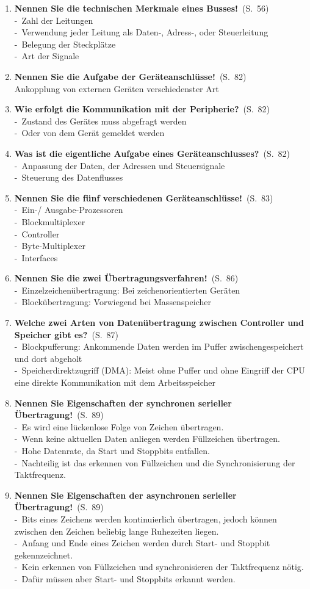 \documentclass[a4paper,12pt]{article}
\newcommand{\question}[3]{\pagebreak[3]\item {\textbf{#1?}}\ (S.\ #2)#3}
\newcommand{\statement}[3]{\pagebreak[3]\item {\textbf{#1!}}\ (S.\ #2)#3}
\newcommand{\catchword}[1]{\\-\ #1}
\newcommand{\normaltext}[1]{\\#1}
\newcommand{\page}[1]{#1}
\begin{document}
\begin{enumerate}
  \statement{Nennen Sie die technischen Merkmale eines Busses}{\page{56}}
  {
    \catchword{Zahl der Leitungen}
    \catchword{Verwendung jeder Leitung als Daten-, Adress-, oder Steuerleitung}
    \catchword{Belegung der Steckplätze}
    \catchword{Art der Signale}
  }

  \statement{Nennen Sie die Aufgabe der Geräteanschlüsse}{\page{82}}
  {
    \normaltext{Ankopplung von externen Geräten verschiedenster Art}
  }

  \question{Wie erfolgt die Kommunikation mit der Peripherie}{\page{82}}
  {
    \catchword{Zustand des Gerätes muss abgefragt werden}
    \catchword{Oder von dem Gerät gemeldet werden}
  }

  \question{Was ist die eigentliche Aufgabe eines Geräteanschlusses}{\page{82}}
  {
    \catchword{Anpassung der Daten, der Adressen und Steuersignale}
    \catchword{Steuerung des Datenflusses}
  }

  \statement{Nennen Sie die fünf verschiedenen Geräteanschlüsse}{\page{83}}
  {
    \catchword{Ein-/ Ausgabe-Prozessoren}
    \catchword{Blockmultiplexer}
    \catchword{Controller}
    \catchword{Byte-Multiplexer}
    \catchword{Interfaces}
  }

  \statement{Nennen Sie die zwei Übertragungsverfahren}{\page{86}}
  {
    \catchword{Einzelzeichenübertragung: Bei zeichenorientierten Geräten}
    \catchword{Blockübertragung: Vorwiegend bei Massenspeicher}
  }

  \question{Welche zwei Arten von Datenübertragung zwischen Controller und Speicher gibt es}{\page{87}}
  {
    \catchword{Blockpufferung: Ankommende Daten werden im Puffer zwischengespeichert und dort abgeholt}
    \catchword{Speicherdirektzugriff (DMA): Meist ohne Puffer und ohne Eingriff der CPU eine
               direkte Kommunikation mit dem Arbeitsspeicher}
  }

  \statement{Nennen Sie Eigenschaften der synchronen serieller Übertragung}{\page{89}}
  {
    \catchword{Es wird eine lückenlose Folge von Zeichen übertragen.}
    \catchword{Wenn keine aktuellen Daten anliegen werden Füllzeichen übertragen.}
    \catchword{Hohe Datenrate, da Start und Stoppbits entfallen.}
    \catchword{Nachteilig ist das erkennen von Füllzeichen und die Synchronisierung der Taktfrequenz.}
  }

  \statement{Nennen Sie Eigenschaften der asynchronen serieller Übertragung}{\page{89}}
  {
    \catchword{Bits eines Zeichens werden kontinuierlich übertragen, jedoch können zwischen den Zeichen
    beliebig lange Ruhezeiten liegen.}
    \catchword{Anfang und Ende eines Zeichen werden durch Start- und Stoppbit gekennzeichnet.}
    \catchword{Kein erkennen von Füllzeichen und synchronisieren der Taktfrequenz nötig.}
    \catchword{Dafür müssen aber Start- und Stoppbits erkannt werden.}
  }


\end{enumerate}
\end{document}
